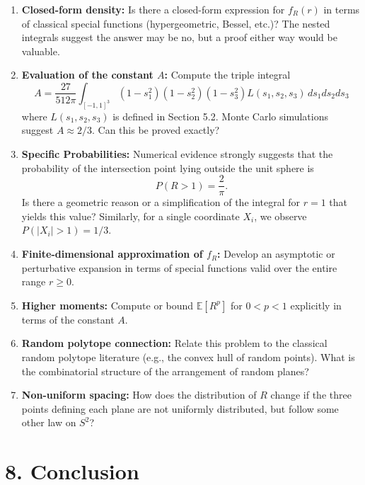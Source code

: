 \documentclass[11pt]{article}
\begin{document}
\begin{enumerate}

\item \textbf{Closed-form density:} Is there a closed-form expression for $f_R(r)$ in terms of
classical special functions (hypergeometric, Bessel, etc.)? The nested integrals suggest the
answer may be no, but a proof either way would be valuable.

\item \textbf{Evaluation of the constant $A$:} Compute the triple integral
\[
A
=
\frac{27}{512\pi}
\int_{[-1,1]^3}
(1-s_1^2)(1-s_2^2)(1-s_3^2)
L(s_1,s_2,s_3)\,ds_1ds_2ds_3
\]
where $L(s_1,s_2,s_3)$ is defined in Section 5.2. Monte Carlo simulations suggest $A \approx 2/3$.
Can this be proved exactly?

\item \textbf{Specific Probabilities:} Numerical evidence strongly suggests that the probability
of the intersection point lying outside the unit sphere is
\[
P(R > 1) = \frac{2}{\pi}.
\]
Is there a geometric reason or a simplification of the integral for $r=1$ that yields this value?
Similarly, for a single coordinate $X_i$, we observe $P(|X_i| > 1) = 1/3$.

\item \textbf{Finite-dimensional approximation of $f_R$:} Develop an asymptotic or perturbative
expansion in terms of special functions valid over the entire range $r \ge 0$.

\item \textbf{Higher moments:} Compute or bound $\mathbb{E}[R^p]$ for $0 < p < 1$ explicitly in
terms of the constant $A$.

\item \textbf{Random polytope connection:} Relate this problem to the classical random polytope
literature (e.g., the convex hull of random points). What is the combinatorial structure of
the arrangement of random planes?

\item \textbf{Non-uniform spacing:} How does the distribution of $R$ change if the three points
defining each plane are not uniformly distributed, but follow some other law on $S^2$?

\end{enumerate}

\section*{8. Conclusion}
\end{document}
